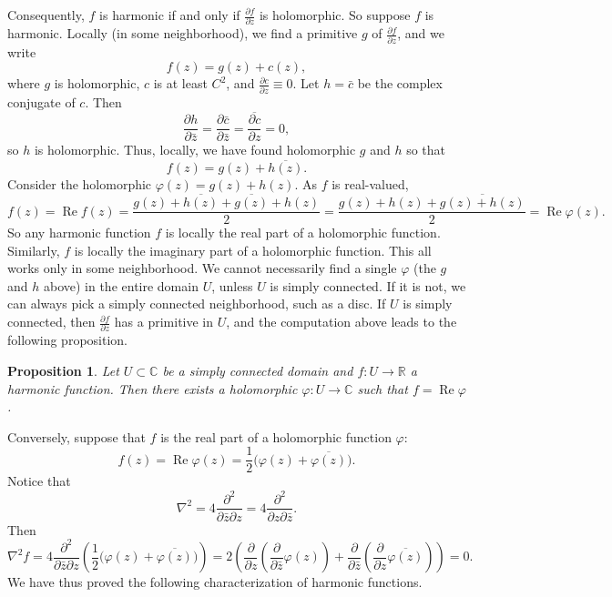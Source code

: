 \documentclass[12pt,openany]{book}
\renewcommand{\Re}{\operatorname{Re}}
\newcommand{\C}{{\mathbb{C}}}
\newcommand{\R}{{\mathbb{R}}}
\theoremstyle{plain}
\newtheorem{prop}[thm]{Proposition}
\theoremstyle{remark}
\theoremstyle{definition}
\theoremstyle{exercise}
\theoremstyle{example}
\begin{document}
Consequently, $f$ is harmonic if and only if
$\frac{\partial f}{\partial z}$ is holomorphic.
So suppose $f$ is harmonic.
Locally (in some neighborhood), we find a
primitive $g$ of $\frac{\partial f}{\partial z}$, and we write
\begin{equation*}
f(z) = g(z) + c(z) ,
\end{equation*}
where $g$ is holomorphic, $c$ is at least $C^2$, and $\frac{\partial c}{\partial z} \equiv 0$.
Let $h = \bar{c}$ be the complex conjugate of $c$.  Then 
\begin{equation*}
\frac{\partial h}{\partial \bar{z}}
=
\frac{\partial \bar{c}}{\partial \bar{z}}
=
\overline{
\frac{\partial c}{\partial z}
}
=
0 ,
\end{equation*}
so $h$ is holomorphic.  Thus, locally, we have found holomorphic $g$ and $h$ so
that
\begin{equation*}
f(z) = g(z) + \overline{h(z)} .
\end{equation*}
Consider the holomorphic $\varphi(z) = g(z) + h(z)$.
As $f$ is real-valued,
\begin{equation*}
f(z) = \Re f(z) =
\frac{g(z) + \overline{h(z)} + \overline{g(z)}+h(z)}{2}
=
\frac{g(z) + h(z) + \overline{g(z)+h(z)}}{2}
=
\Re \varphi(z) .
\end{equation*}
So any harmonic function $f$ is locally the real part of a holomorphic
function.  Similarly, $f$ is locally the imaginary part of a holomorphic
function.
This all works only in some neighborhood.  We cannot necessarily find a single
$\varphi$ (the $g$ and $h$ above) in the entire
domain $U$, unless $U$ is simply connected.  If it is not, we can always
pick a simply connected neighborhood, such as a disc.
If $U$ is simply connected, then
$\frac{\partial f}{\partial z}$ has a primitive in $U$,
and the computation above leads to
the following proposition.

\begin{prop} \label{prop:harmconj}
Let $U \subset \C$ be a simply connected domain and $f \colon U \to \R$ a
harmonic function.  Then there exists a holomorphic $\varphi \colon
U \to \C$ such that $f = \Re \varphi$.
\end{prop}

Conversely,
suppose that $f$ is the real part of a holomorphic function $\varphi$:
\begin{equation*}
f(z) = \Re \varphi(z) =
\frac{1}{2}\bigl( \varphi(z) + \overline{\varphi(z)} \bigr) .
\end{equation*}
Notice that
\begin{equation*}
\nabla^2 =
4 \frac{\partial^2}{\partial \bar{z} \partial z}
=
4 \frac{\partial^2}{\partial z \partial \bar{z}} .
\end{equation*}
Then
\begin{equation*}
\nabla^2 f =
4 \frac{\partial^2}{\partial \bar{z} \partial z}
\left(
\frac{1}{2}\bigl( \varphi(z) + \overline{\varphi(z)} \bigr)
\right)
=
2
\left(
\frac{\partial}{\partial z}
\left(
\frac{\partial}{\partial \bar{z}}
\varphi(z)
\right)+
\frac{\partial}{\partial \bar{z}}
\left(
\frac{\partial}{\partial z}
\overline{\varphi(z)}
\right)
\right)
=
0 .
\end{equation*}
We have thus proved the following characterization of harmonic
functions.
\end{document}
